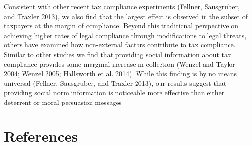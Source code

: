 \documentclass[12pt,titlepage]{article}
\begin{document}
Consistent with other recent tax compliance experiments (Fellner,
Sausgruber, and Traxler 2013), we also find that the largest effect is
observed in the subset of taxpayers at the margin of compliance.
Beyond this traditional perspective on achieving higher rates of legal
compliance through modifications to legal threats, others have
examined how non-external factors contribute to tax
compliance. Similar to other studies we find that providing social
information about tax compliance provides some marginal increase in
collection (Wenzel and Taylor 2004; Wenzel 2005; Hallsworth et
al. 2014). While this finding is by no means universal (Fellner,
Sausgruber, and Traxler 2013), our results suggest that providing
social norm information is noticeable more effective than either
deterrent or moral persuasion messages

\newpage

\section*{References}
\end{document}
